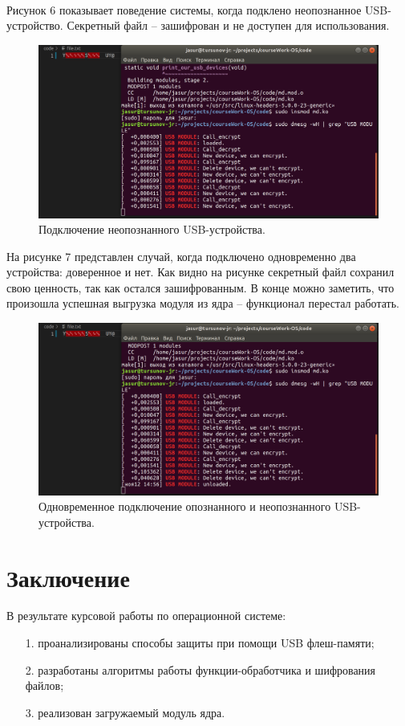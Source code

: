 \documentclass[a4paper, 10pt]{article}
\begin{document}
	\\ \hspace*{5mm} Рисунок 6 показывает поведение системы, когда подклено неопознанное USB-устройство. Секретный файл -- зашифрован и не доступен для использования.
	\clearpage
	\newpage
	\begin{figure}[h!]
		\centering
		\includegraphics[scale=0.2]{4}
		\centering\caption{Подключение неопознанного USB-устройства.}
	\end{figure}
	\hspace*{5mm} На рисунке 7 представлен случай, когда подключено одновременно два устройства: доверенное и нет. Как видно на рисунке секретный файл сохранил свою ценность, так как остался зашифрованным. В конце можно заметить, что произошла успешная выгрузка модуля из ядра -- функционал перестал работать. 
	\begin{figure}[h!]
		\centering
		\includegraphics[scale=0.2]{5}
		\centering\caption{Одновременное подключение опознанного и неопознанного USB-устройства.}
	\end{figure}
	\clearpage
	\newpage
\section*{Заключение}
	В результате курсовой работы по операционной системе:
	\begin{enumerate}
		\item[1. ] проанализированы способы защиты при помощи USB флеш-памяти;
		\item[2. ] разработаны алгоритмы работы функции-обработчика и шифрования файлов;
		\item[3. ] реализован загружаемый модуль ядра.
	\end{enumerate}
	
\end{document}
